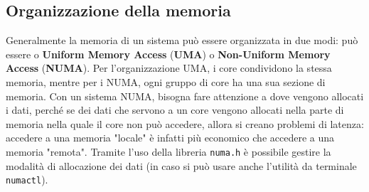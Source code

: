 \subsection{Organizzazione della memoria}

Generalmente la memoria di un sistema può essere organizzata in due modi: può essere o \textbf{Uniform Memory Access} (\textbf{UMA}) o \textbf{Non-Uniform Memory Access} (\textbf{NUMA}). Per l'organizzazione UMA, i core condividono la stessa memoria, mentre per i NUMA, ogni gruppo di core ha una sua sezione di memoria. Con un sistema NUMA, bisogna fare attenzione a dove vengono allocati i dati, perché se dei dati che servono a un core vengono allocati nella parte di memoria nella quale il core non può accedere, allora si creano problemi di latenza: accedere a una memoria "locale" è infatti più economico che accedere a una memoria "remota". Tramite l'uso della libreria \verb|numa.h| è possibile gestire la modalità di allocazione dei dati (in caso si può usare anche l'utilità da terminale \verb|numactl|).
\nl
